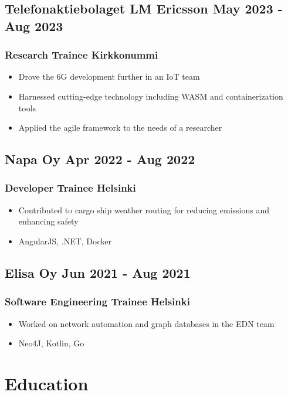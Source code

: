 \documentclass[12pt]{article} %
\begin{document}
\subsection{Telefonaktiebolaget LM Ericsson \hfill May 2023 - Aug 2023}
\subsubsection{Research Trainee \hfill  Kirkkonummi}
\begin{itemize}
  \item Drove the 6G development further in an IoT team
  \item Harnessed cutting-edge technology including WASM and containerization tools
  \item Applied the agile framework to the needs of a researcher
\end{itemize}

\subsection{Napa Oy \hfill Apr 2022 - Aug 2022}
\subsubsection{Developer Trainee \hfill Helsinki}
\begin{itemize}
  \item Contributed to cargo ship weather routing for reducing emissions and enhancing safety
  \item AngularJS, .NET, Docker
\end{itemize}

\subsection{Elisa Oy \hfill Jun 2021 - Aug 2021}
\subsubsection{Software Engineering Trainee \hfill Helsinki}
\begin{itemize}
  \item Worked on network automation and graph databases in the EDN team
  \item Neo4J, Kotlin, Go
\end{itemize}

\section{Education}
\end{document}
